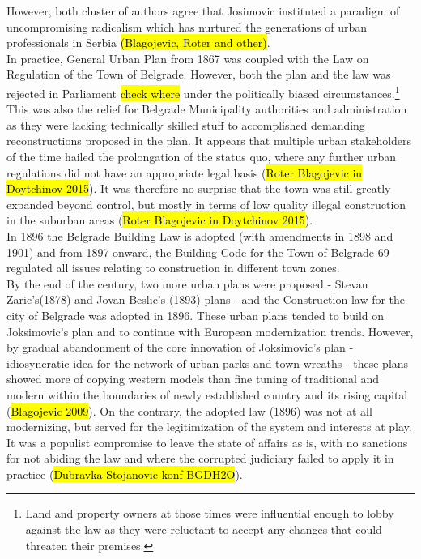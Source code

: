 \documentclass[11pt]{report}
\begin{document}
However, both cluster of authors agree that Josimovic instituted a paradigm of uncompromising radicalism which has nurtured the generations of urban professionals in Serbia \hl{(Blagojevic, Roter and other)}.
\\
In practice, General Urban Plan from 1867 was coupled with the Law on Regulation of the Town of Belgrade. However, both the plan and the law was rejected in Parliament \hl{check where} under the politically biased circumstances.\footnote{Land and property owners at those times were influential enough to lobby against the law as they were reluctant to accept any changes that could threaten their premises.}
This was also the relief for Belgrade Municipality authorities and administration as they were lacking technically skilled stuff to accomplished demanding reconstructions proposed in the plan.
It appears that multiple urban stakeholders of the time hailed the prolongation of the status quo, where any further urban regulations did not have an appropriate legal basis (\hl{Roter Blagojevic in Doytchinov 2015}). It was therefore no surprise that the town was still greatly  expanded  beyond  control,  but mostly in terms of  low quality illegal  construction  in the suburban areas (\hl{Roter Blagojevic in Doytchinov 2015}).
\\
In 1896 the Belgrade Building Law is adopted (with amendments in 1898 and 1901) and from 1897 onward, the Building Code for the Town of Belgrade 69 regulated all issues relating to construction in different town zones.
\\
By the end of the century, two more urban plans were proposed - Stevan Zaric's(1878) and Jovan Beslic's (1893) plans - and the Construction law for the city of Belgrade was adopted in 1896. These urban plans tended to build on Joksimovic's plan and to continue with European modernization trends.
However, by gradual abandonment of the core innovation of Joksimovic's plan - idiosyncratic idea for the network of urban parks and town wreaths - these plans showed more of copying western models than fine tuning of traditional and modern within the boundaries of newly established country and its rising capital (\hl{Blagojevic 2009}). On the contrary, the adopted law (1896) was not at all modernizing, but served for the legitimization of the system and interests at play.
It was a populist compromise to leave the state of affairs as is, with no sanctions for not abiding the law and where the corrupted judiciary failed to apply it in practice (\hl{Dubravka Stojanovic konf BGDH2O}). 
\\
\end{document}
